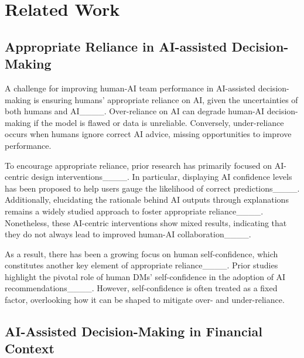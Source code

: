 \section{Related Work}
\subsection{Appropriate Reliance in AI-assisted Decision-Making}
A challenge for improving human-AI team performance in AI-assisted decision-making is ensuring humans’ appropriate reliance on AI, given the uncertainties of both humans and AI____.
Over-reliance on AI can degrade human-AI decision-making if the model is flawed or data is unreliable. Conversely, under-reliance occurs when humans ignore correct AI advice, missing opportunities to improve performance.

To encourage appropriate reliance, prior research has primarily focused on AI-centric design interventions____. In particular, displaying AI confidence levels has been proposed to help users gauge the likelihood of correct predictions____. Additionally, elucidating the rationale behind AI outputs through explanations remains a widely studied approach to foster appropriate reliance____.
Nonetheless, these AI-centric interventions show mixed results, indicating that they do not always lead to improved human-AI collaboration____.

As a result, there has been a growing focus on human self-confidence, which constitutes another key element of appropriate reliance____. Prior studies highlight the pivotal role of human DMs' self-confidence in the adoption of AI recommendations____.
However, self-confidence is often treated as a fixed factor, overlooking how it can be shaped to mitigate over- and under-reliance. 




\subsection{AI-Assisted Decision-Making in Financial Context}

